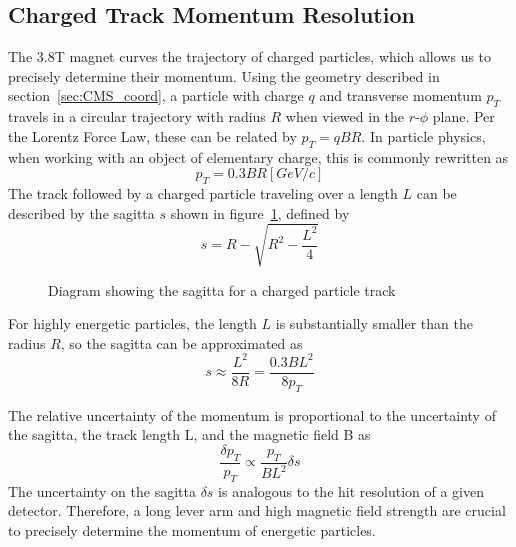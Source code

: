 \subsection{Charged Track Momentum Resolution} \label{sec:CMS_sagitta}
The 3.8\unit{\tesla} magnet curves the trajectory of charged particles, which allows us to precisely determine their momentum. Using the geometry described in section~\ref{sec:CMS_coord}, a particle with charge $q$ and transverse momentum $p_T$ travels in a circular trajectory with radius $R$ when viewed in the $r$-$\phi$ plane. Per the Lorentz Force Law, these can be related by $p_{T} = qBR$. In particle physics, when working with an object of elementary charge, this is commonly rewritten as
\begin{equation}
	\label{eq:pt03br}
	p_{T} = 0.3BR\unit{[GeV/c]}
\end{equation}
The track followed by a charged particle traveling over a length $L$ can be described by the sagitta $s$ shown in figure~\ref{fig:sagitta}, defined by
\begin{equation} \label{eq:sagitta}
	s=R-\sqrt{R^2-\frac{L^2}{4}}
\end{equation}

\begin{figure}[htb!]
	\centering
	
	\caption{Diagram showing the sagitta for a charged particle track}
	\label{fig:sagitta}
\end{figure}

For highly energetic particles, the length $L$ is substantially smaller than the radius $R$, so the sagitta can be approximated as
\begin{equation} \label{eq:sagitta_approx}
	s\approx\frac{L^2}{8R}=\frac{0.3BL^2}{8p_T}
\end{equation}

The relative uncertainty of the momentum is proportional to the uncertainty of the sagitta, the track length L, and the magnetic field B as
\begin{equation} \label{eq:dptOverpt}
	\frac{\delta p_T}{p_T}\propto\frac{p_T}{BL^2}\delta s
\end{equation}
The uncertainty on the sagitta $\delta s$ is analogous to the hit resolution of a given detector. Therefore, a long lever arm and high magnetic field strength are crucial to precisely determine the momentum of energetic particles.


